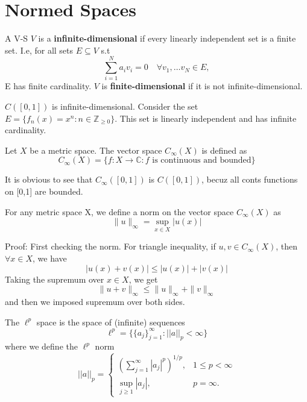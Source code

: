 \chapter{Normed Spaces}


\begin{definition}
A V-S $V$ is a \textbf{infinite-dimensional} if every linearly independent set is a finite set. I.e, for all sets $E \subseteq V$ s.t \[\sum_{i=1}^{N}a_i v_i = 0 \quad \forall v_1 , \dots v_N \in E, \] 
E has finite cardinality. $V$ is \textbf{finite-dimensional} if it is not infinite-dimensional.
\end{definition}

\begin{example}

    $C([0,1])$ is infinite-dimensional. Consider the set $E = \{f_n(x) = x^n : n \in \mathbb{Z}_{\geq 0}\}$. This set is linearly independent and has infinite cardinality.

\end{example}

\begin{definition}
    Let $X$ be a metric space. The vector space $C_\infty(X)$ is defined as \[C_\infty(X) = \{f : X \to \mathbb{C} : f \text{ is continuous and bounded}\}\]
\end{definition}

It is obvious to see that $C_\infty([0,1])$ is $C([0,1])$, becuz all conts functions on [0,1] are bounded.

\begin{proposition}
    For any metric space X, we define a norm on the vector space $C_\infty(X)$ as \[\|u\|_\infty = \sup_{x \in X} |u(x)|\]
\end{proposition}

Proof: First checking the norm. For triangle inequality, if $u,v \in C_\infty(X)$, then $\forall x \in X$, we have \[|u(x) + v(x)| \leq |u(x)| + |v(x)|\] Taking the supremum over $x \in X$, we get $$\|u + v\|_\infty \leq \|u\|_\infty + \|v\|_\infty$$ and then we imposed supremum over both sides.


\begin{definition}
    The $\ell^p$ space is the space of (infinite) sequences \[\ell^p = \{\{a_j\}_{j=1}^\infty : ||a||_p < \infty\}\]
    where we define the $\ell^p$ norm \[||a||_p = \begin{cases}
        (\sum_{j=1}^\infty |a_j|^p)^{1/p}, & 1 \leq p < \infty \\
        \sup_{j \geq 1} |a_j|, & p = \infty .\end{cases}\]
\end{definition}

